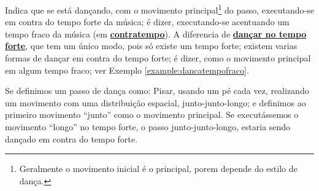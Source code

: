 \begin{definition} 
\label{def:DancaNoContratempo}
Indica que se está dançando, com o movimento principal\footnote{Geralmente o movimento inicial é o principal,
porem depende do estilo de dança.} do passo, 
executando-se em contra do tempo forte da música; é dizer, 
executando-se acentuando um tempo fraco da música (em \hyperref[sec:contratempo]{\textbf{contratempo}}).
A diferencia de \hyperref[def:DancaNoTempo]{\textbf{dançar no tempo forte}}, 
que tem um único modo, pois só existe um tempo forte;
existem varias formas de dançar em contra do tempo forte;
é dizer, como o movimento principal em algum tempo fraco; ver Exemplo \ref{example:dancatempofraco}.
\end{definition}
\begin{example}
\label{example:dancatempofraco}
Se definimos um passo de dança como: Pisar, usando um pé cada vez, 
realizando um movimento com uma distribuição espacial, junto-junto-longo;
e definimos ao primeiro movimento ``junto'' como o movimento principal. 
Se executássemos o movimento ``longo'' no tempo forte, o passo junto-junto-longo,
estaria sendo dançado em contra do tempo forte.
\end{example}
